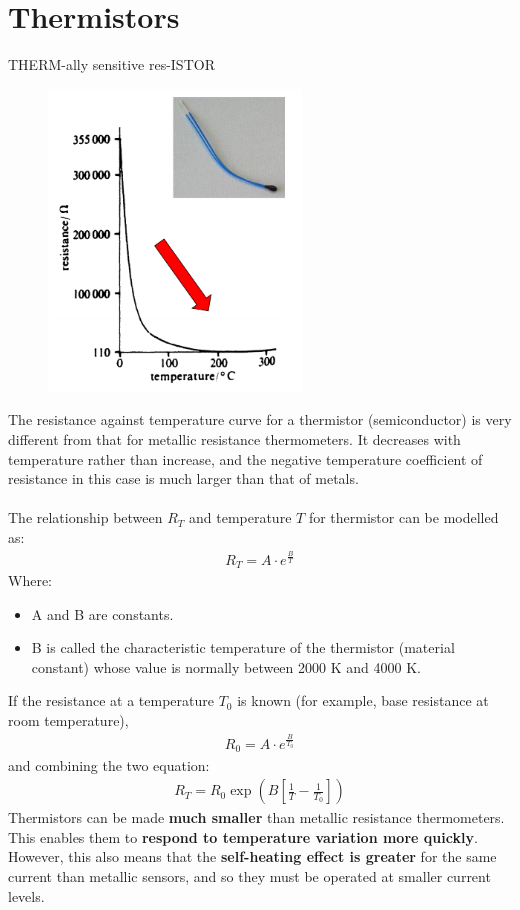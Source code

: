 \documentclass[class=report, crop=false, 12pt,a4paper]{standalone}
\begin{document}
\section{Thermistors}
THERM-ally sensitive res-ISTOR
\begin{figure}[H]
  \centering
  \includegraphics[width = 0.6\textwidth]{../img/Mdiagram70.png}
\end{figure}
The resistance against temperature curve for a thermistor (semiconductor) is very different from that for metallic resistance thermometers. It decreases with temperature rather than increase, and the negative temperature coefficient of resistance in this case is much larger than that of metals. \\\\
The relationship between $R_T$ and temperature $T$ for thermistor can be modelled as:
\begin{gather}
  R_T = A\cdot e^{\frac{B}{T}}
\end{gather}
Where:
\begin{itemize}
  \item A and B are constants. 
  \item B is called the characteristic temperature of the thermistor (material constant) whose value is normally between 2000 K and 4000 K.
\end{itemize}
If the resistance at a temperature $T_0$ is known (for example, base resistance at room temperature),
\begin{gather}
  R_0 = A\cdot e^{\frac{B}{T_0}}
\end{gather}
and combining the two equation:
\begin{gather}
  R_T = R_0\exp\left(B\left[\frac{1}{T}-\frac{1}{T_0}\right]\right)
\end{gather}
Thermistors can be made \textbf{much smaller} than metallic resistance thermometers. This enables them to \textbf{respond to temperature variation more quickly}. However, this also means that the \textbf{self-heating effect is greater} for the same current than metallic sensors, and so they must be operated at smaller current levels.
\end{document}
